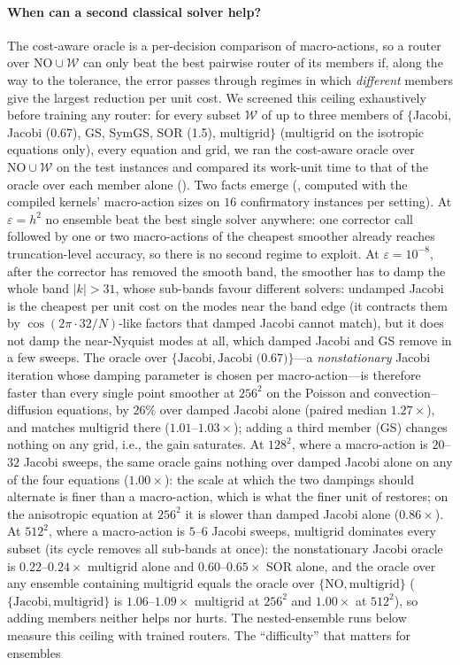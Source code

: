 \paragraph{When can a second classical solver help?} The cost-aware oracle is a per-decision comparison of macro-actions, so a router over $\mathrm{NO}\cup\mathcal{W}$ can only beat the best pairwise router of its members if, along the way to the tolerance, the error passes through regimes in which \emph{different} members give the largest reduction per unit cost. We screened this ceiling exhaustively before training any router: for every subset $\mathcal{W}$ of up to three members of $\{$Jacobi, Jacobi (0.67), GS, SymGS, SOR (1.5), multigrid$\}$ (multigrid on the isotropic equations only), every equation and grid, we ran the cost-aware oracle over $\mathrm{NO}\cup\mathcal{W}$ on the test instances and compared its work-unit time to that of the oracle over each member alone (). Two facts emerge (, computed with the compiled kernels' macro-action sizes on $16$ confirmatory instances per setting). At $\varepsilon = h^2$ no ensemble beat the best single solver anywhere: one corrector call followed by one or two macro-actions of the cheapest smoother already reaches truncation-level accuracy, so there is no second regime to exploit. At $\varepsilon = 10^{-8}$, after the corrector has removed the smooth band, the smoother has to damp the whole band $|k| > 31$, whose sub-bands favour different solvers: undamped Jacobi is the cheapest per unit cost on the modes near the band edge (it contracts them by $\cos(2\pi\cdot 32/N)$-like factors that damped Jacobi cannot match), but it does not damp the near-Nyquist modes at all, which damped Jacobi and GS remove in a few sweeps. The oracle over $\{\text{Jacobi}, \text{Jacobi (0.67)}\}$---a \emph{nonstationary} Jacobi iteration whose damping parameter is chosen per macro-action---is therefore faster than every single point smoother at $256^2$ on the Poisson and convection--diffusion equations, by $26\%$ over damped Jacobi alone (paired median $1.27\times$), and matches multigrid there ($1.01$--$1.03\times$); adding a third member (GS) changes nothing on any grid, i.e., the gain saturates. At $128^2$, where a macro-action is $20$--$32$ Jacobi sweeps, the same oracle gains nothing over damped Jacobi alone on any of the four equations ($1.00\times$): the scale at which the two dampings should alternate is finer than a macro-action, which is what the finer unit of  restores; on the anisotropic equation at $256^2$ it is slower than damped Jacobi alone ($0.86\times$). At $512^2$, where a macro-action is $5$--$6$ Jacobi sweeps, multigrid dominates every subset (its cycle removes all sub-bands at once): the nonstationary Jacobi oracle is $0.22$--$0.24\times$ multigrid alone and $0.60$--$0.65\times$ SOR alone, and the oracle over any ensemble containing multigrid equals the oracle over $\{\mathrm{NO}, \text{multigrid}\}$ ($\{\text{Jacobi}, \text{multigrid}\}$ is $1.06$--$1.09\times$ multigrid at $256^2$ and $1.00\times$ at $512^2$), so adding members neither helps nor hurts. The nested-ensemble runs below measure this ceiling with trained routers. The ``difficulty'' that matters for ensembles 